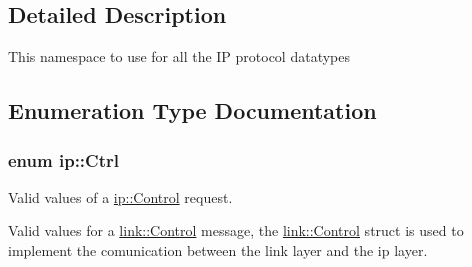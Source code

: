 \subsection{Detailed Description}
This namespace to use for all the IP protocol datatypes 

\subsection{Enumeration Type Documentation}
\subsubsection[{\texorpdfstring{Ctrl}{Ctrl}}]{\setlength{\rightskip}{0pt plus 5cm}enum {\bf ip\+::\+Ctrl}}\hypertarget{namespaceip_a341d8827cf57ab044a78c05922bea473}{}\label{namespaceip_a341d8827cf57ab044a78c05922bea473}


Valid values of a \hyperlink{structip_1_1Control}{ip\+::\+Control} request. 

Valid values for a \hyperlink{structlink_1_1Control}{link\+::\+Control} message, the \hyperlink{structlink_1_1Control}{link\+::\+Control} struct is used to implement the comunication between the link layer and the ip layer. 